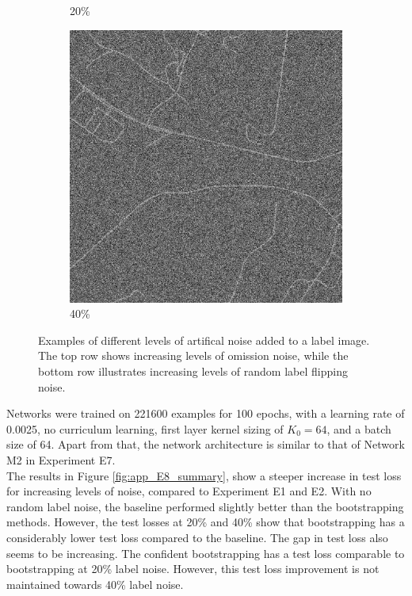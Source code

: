 \begin{figure}[!b]
\begin{subfigure}{0.31\textwidth}
\caption{20\%}
\end{subfigure}
\hspace*{\fill} %
\begin{subfigure}{0.31\textwidth}
\includegraphics[width=\linewidth]{figs/E8/flipping/noise4.png}
\caption{40\%}
\end{subfigure}
\caption[Artifical noise examples]{Examples of different levels of artifical noise added to a label image. The top row shows increasing levels of omission noise, while the bottom row illustrates increasing levels of random label flipping noise. } \label{fig:app_E8_noise_flipping}
\end{figure}

Networks were trained on 221600 examples for 100 epochs, with a learning rate of 0.0025, no curriculum learning, first layer kernel sizing of $K_0=64$, and a batch size of 64. Apart from that, the network architecture is similar to that of Network M2 in Experiment E7.\\

The results in Figure \ref{fig:app_E8_summary}, show a steeper increase in test loss for increasing levels of noise, compared to Experiment E1 and E2. With no random label noise, the baseline performed slightly better than the bootstrapping methods. However, the test losses at 20\% and 40\% show that bootstrapping has a considerably lower test loss compared to the baseline. The gap in test loss also seems to be increasing. The confident bootstrapping has a test loss comparable to bootstrapping at 20\% label noise. However, this test loss improvement is not maintained towards 40\% label noise. \\

